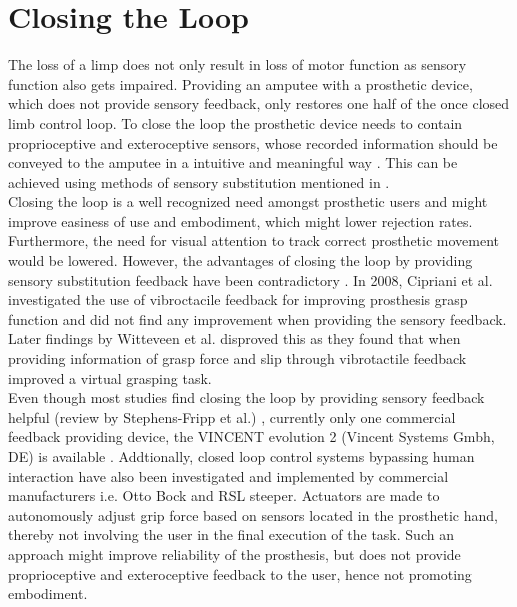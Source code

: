 \section{Closing the Loop}

The loss of a limp does not only result in loss of motor function as sensory function also gets impaired. Providing an amputee with a prosthetic device, which does not provide sensory feedback, only restores one half of the once closed limb control loop. To close the loop the prosthetic device needs to contain proprioceptive and exteroceptive sensors, whose recorded information should be conveyed to the amputee in a intuitive and meaningful way \cite{Markovic2018}. This can be achieved using methods of sensory substitution mentioned in . \\
Closing the loop is a well recognized need amongst prosthetic users and might improve easiness of use and embodiment, which might lower rejection rates. Furthermore, the need for visual attention to track correct prosthetic movement would be lowered. \cite{Strbac2016} However, the advantages of closing the loop by providing sensory substitution feedback have been contradictory \cite{Jorgovanovic2014}. In 2008, Cipriani et al. \cite{Cipriani2008} investigated the use of vibroctacile feedback for improving prosthesis grasp function and did not find any improvement when providing the sensory feedback. Later findings by Witteveen et al. \cite{Witteveen2012} disproved this as they found that when providing information of grasp force and slip through vibrotactile feedback improved a virtual grasping task. \\
Even though most studies find closing the loop by providing sensory feedback helpful (review by Stephens-Fripp et al.) \cite{Stephens-Fripp2018}, currently only one commercial feedback providing device, the VINCENT evolution 2 (Vincent Systems Gmbh, DE) is available \cite{Systems2005}.  
Addtionally, closed loop control systems bypassing human interaction have also been investigated and implemented by commercial manufacturers i.e. Otto Bock and RSL steeper. Actuators are made to autonomously adjust grip force based on sensors located in the prosthetic hand, thereby not involving the user in the final execution of the task. \cite{Xu2016} Such an approach might improve reliability of the prosthesis, but does not provide proprioceptive and exteroceptive feedback to the user, hence not promoting embodiment.  




